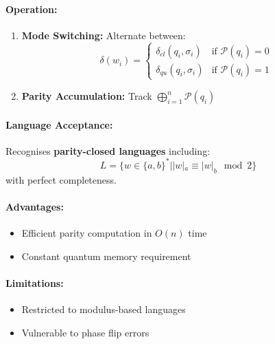 \paragraph{Operation:}
\begin{enumerate}
    \item \textbf{Mode Switching:} Alternate between:
    \[
    \delta(w_i) = \begin{cases}
        \delta_{cl}(q_i, \sigma_i) & \text{if } \mathcal{P}(q_i) = 0 \\
        \delta_{qu}(q_i, \sigma_i) & \text{if } \mathcal{P}(q_i) = 1
    \end{cases}
    \]
    \item \textbf{Parity Accumulation:} Track $\bigoplus_{i=1}^n \mathcal{P}(q_i)$
\end{enumerate}

\paragraph{Language Acceptance:}
Recognises \textbf{parity-closed languages} including:
\[
L = \{w \in \{a,b\}^* | |w|_a \equiv |w|_b \mod 2\} 
\]
\cite{hirvensalo2012quantum}
with perfect completeness.

\paragraph{Advantages:}
\begin{itemize}
    \item Efficient parity computation in $O(n)$ time
    \item Constant quantum memory requirement \cite{yakaryilmaz2011}
\end{itemize}

\paragraph{Limitations:}
\begin{itemize}
    \item Restricted to modulus-based languages
    \item Vulnerable to phase flip errors
\end{itemize}

\subsection{}
\label{subsec:bcqfa}

